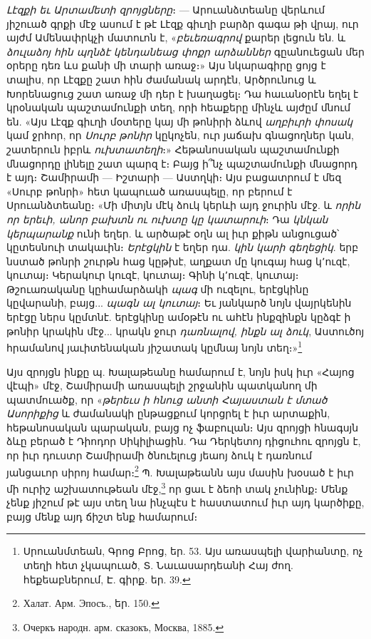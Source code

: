 \documentclass{article}
\begin{document}
{\emph{Լէզքի եւ Արտամետի զրոյցները}։ — Արուանձտեանը վերևում յիշուած գրքի մէջ ասում է թէ Լէզք գիւղի բարձր գագա թի վրայ, ուր այժմ Ամենափրկչի մատուոն է, «\emph{բեւեռագրով} քարեր լեցուն են. և \emph{ձուլաձոյ հին պղնձէ կենդանեաց փոքր արձաններ} գըանուեցան մեր օրերը դեռ ևս քանի մի տարի առաջ։» Այս նկարագիրը ցոյց է տալիս, որ Լէզքը շատ հին ժամանակ արդէն, Արծրունուց և Խորենացուց շատ առաջ մի դեր է խաղացել։ Դա հաւանօրէն եղել է կրօնական պաշտամունքի տեղ, որի հեաքերը մինչև այժըմ մնում են. «Այս Լէզք գիւղի մօտերը կայ մի թոնիրի ձևով \emph{աղբիւրի փոսակ} կամ ջրհոր, որ \emph{Սուրբ թոնիր} կըկոչեն, ուր յաճախ գնացողներ կան, շատերուն իբրև \emph{ուխտատեղի}։» Հեթանոսական պաշտամունքի մնացորդը լինելը շատ պարզ է։ Բայց ի՞նչ պաշտամունքի մնացորդ է այդ։ Շամիրամի — Իշտարի — Աստղկի։ Այս բացատրում է մեզ «Սուրբ թոնրի» հետ կապուած առասպելը, որ բերում է Սրուանձտեանը։ «Մի միտյն մէկ ձուկ կերևի այդ ջուրին մէջ. և \emph{որին որ երեւի, անոր բախտն ու ուխտը կը կատարուի}։ Դա \emph{կնկան կերպարանք} ունի եղեր. և արծաթէ օղն ալ իւր քիթն անցուցած՝ կըտեսնուի տակաւին։ \emph{Երէցկին} է եղեր դա. \emph{կին կարի գեղեցիկ}. երբ նստած թոնրի շուրթն հաց կըթխէ, աղքատ մը կուգայ հաց կ՚ուզէ, կուտայ։ Կերակուր կուզէ, կուտայ։ Գինի կ՚ուզէ, կուտայ։ Թշուառականը կըհամարձակի \emph{պագ} մի ուզելու, երէցկինը կըվարանի, բայց... \emph{պագն ալ կուտայ}։ Եւ յանկարծ նոյն վայրկենին երէցը ներս կըմտնէ. երէցկինը ամօթէն ու ահէն ինքզինքն կըձգէ ի թոնիր կրակին մէջ... կրակն ջուր \emph{դառնալով, ինքն ալ ձուկ}, Աստուծոյ հրամանով յաւիտենական յիշատակ կըմնայ նոյն տեղ։»\footnote{Սրուանմտեան, Գրոց Բրոց, եր. 53. Այս առասպելի վարիանտը, ոչ տեղի հետ չկապուած, Տ. Նաւասարդեանի Հայ ժող. հեքեաբներում, Է. գիրք. եր. 39.}

Այս զրոյցն ինքը պ. Խալաթեանը համարում է, նոյն իսկ իւր «Հայոց վէպի» մէջ, Շամիրամի առասպելի շրջանին պատկանող մի պատմուածք, որ «\emph{թերեւս ի հնուց անտի Հայաստան է մտած Ասորիքից} և ժամանակի ընթացքում կորցրել է իւր արտաքին, հեթանոսական պարական, բայց ոչ ֆաբուլան։ Այս զրոյցի հնագսյն ձևը բերած է Դիոդոր Սիկիլիացին. Դա Դերկետոյ դիցուհու զրոյցն է, որ իւր դուստր Շամիրամի ծնուելուց յեաոյ ձուկ է դառնում յանցաւոր սիրոյ համար։\footnote{Халат. Арм. Эпосъ., եր. 150.} Պ. Խալաթեանն այս մասին խօսած է իւր մի ուրիշ աշխատութեան մէջ,\footnote{Очеркъ народн. арм. сказокъ, Москва, 1885.} որ ցաւ է ձեոի տակ չունինք։ Մենք չենք յիշում թէ այս տեղ նա ինչպէս է հաստատում իւր այդ կարծիքը, բայց մենք այդ ճիշտ ենք համարում։

}
\end{document}
